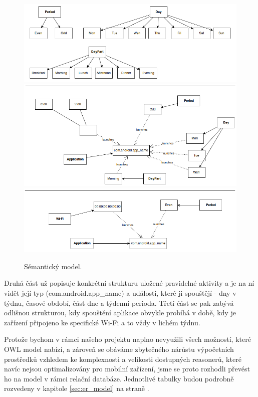 \documentclass[thesis=M,czech]{FITthesis}[2012/06/26]
\begin{document}
\begin{figure}\centering
	\includegraphics[width=1\textwidth]{figures/semantic1}
	\includegraphics[width=1\textwidth]{figures/semantic2}
	\includegraphics[width=1\textwidth]{figures/semantic3}
	\caption{Sémantický model.}
	\label{fig:semantic}
\end{figure}

Druhá část už popisuje konkrétní strukturu uložené pravidelné aktivity a je na ní vidět její typ (com.android.app\_name) a události, které ji spouštějí - dny v týdnu, časové období, část dne a týdenní perioda. Třetí část se pak zabývá odlišnou strukturou, kdy spouštění aplikace obvykle probíhá v době, kdy je zařízení připojeno ke specifické Wi-Fi a to vždy v lichém týdnu.

Protože bychom v rámci našeho projektu naplno nevyužili všech možností, které OWL model nabízí, a zároveň se obáváme zbytečného nárůstu výpočetních prostředků vzhledem ke komplexnosti a velikosti dostupných reasonerů, které navíc nejsou optimalizovány pro mobilní zařízení, jsme se proto rozhodli převést ho na model v rámci relační databáze. Jednotlivé tabulky budou podrobně rozvedeny v kapitole \ref{sec:er_model} na straně \pageref{sec:er_model}.
\end{document}
